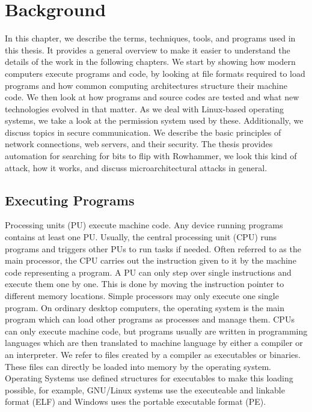 \chapter{Background}\label{sec:general}

In this chapter, we describe the terms, techniques, tools, and programs used in
this thesis. It provides a general overview to make it easier to understand the
details of the work in the following chapters. We start by showing how modern
computers execute programs and code, by looking at file formats required to
load programs and how common computing architectures structure their machine
code. We then look at how programs and source codes are tested and what new
technologies evolved in that matter. As we deal with Linux-based operating
systems, we take a look at the permission system used by these. Additionally,
we discuss topics in secure communication. We describe the basic principles of
network connections, web servers, and their security. The thesis provides
automation for searching for bits to flip with Rowhammer, we look this kind of
attack, how it works, and discuss microarchitectural attacks in general.

\section{Executing Programs}

Processing units (PU) execute machine code. Any device running programs contains
at least one PU. Usually, the central processing unit (CPU) runs programs and
triggers other PUs to run tasks if needed. Often referred to as the main
processor, the CPU carries out the instruction given to it by the machine code
representing a program. A PU can only step over single instructions and execute
them one by one. This is done by moving the instruction pointer to different
memory locations. Simple processors may only execute one single program. On
ordinary desktop computers, the operating system is the main program which can
load other programs as processes and manage them. CPUs can only execute machine
code, but programs usually are written in programming languages which are then
translated to machine language by either a compiler or an interpreter. We refer
to files created by a compiler as executables or binaries. These files can
directly be loaded into memory by the operating system. Operating Systems use
defined structures for executables to make this loading possible, for example,
GNU/Linux systems use the executeable and linkable format (ELF) and Windows
uses the portable executable format (PE).

